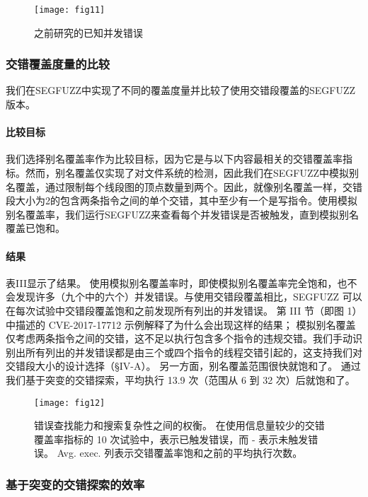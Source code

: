 \begin{figure}[ht]
    \centering
    \texttt{[image: fig11]}
    \caption{\label{fig:fig11}之前研究的已知并发错误}
\end{figure}

\subsubsection{交错覆盖度量的比较}

我们在SEGFUZZ中实现了不同的覆盖度量并比较了使用交错段覆盖的SEGFUZZ版本。

\paragraph{比较目标}我们选择别名覆盖率作为比较目标，因为它是与以下内容最相关的交错覆盖率指标。然而，别名覆盖仅实现了对文件系统的检测，因此我们在SEGFUZZ中模拟别名覆盖，通过限制每个线段图的顶点数量到两个。因此，就像别名覆盖一样，交错段大小为2的包含两条指令之间的单个交错，其中至少有一个是写指令。使用模拟别名覆盖率，我们运行SEGFUZZ来查看每个并发错误是否被触发，直到模拟别名覆盖已饱和。
\paragraph{结果}表III显示了结果。 使用模拟别名覆盖率时，即使模拟别名覆盖率完全饱和，也不会发现许多（九个中的六个）并发错误。与使用交错段覆盖相比，SEGFUZZ 可以在每次试验中交错段覆盖饱和之前发现所有列出的并发错误。 第 III 节（即图 1）中描述的 CVE-2017-17712 示例解释了为什么会出现这样的结果； 模拟别名覆盖仅考虑两条指令之间的交错，这不足以执行包含多个指令的违规交错。我们手动识别出所有列出的并发错误都是由三个或四个指令的线程交错引起的，这支持我们对交错段大小的设计选择（§IV-A）。 另一方面，别名覆盖范围很快就饱和了。 通过我们基于突变的交错探索，平均执行 13.9 次（范围从 6 到 32 次）后就饱和了。

\begin{figure}[ht]
    \centering
    \texttt{[image: fig12]}
    \caption{\label{fig:fig12}错误查找能力和搜索复杂性之间的权衡。 在使用信息量较少的交错覆盖率指标的 10 次试验中，\checkmark 表示已触发错误，而 - 表示未触发错误。 Avg. exec. 列表示交错覆盖率饱和之前的平均执行次数。}
\end{figure}

\subsubsection{基于突变的交错探索的效率}


